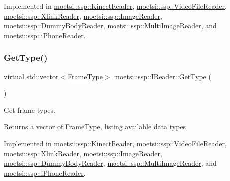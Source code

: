 Implemented in \hyperlink{classmoetsi_1_1ssp_1_1KinectReader_aef896aa686cbe1ea82dfc6aad46b6ff7}{moetsi\+::ssp\+::\+Kinect\+Reader}, \hyperlink{classmoetsi_1_1ssp_1_1VideoFileReader_a9d47af47299c5fccf766ac2d848a561b}{moetsi\+::ssp\+::\+Video\+File\+Reader}, \hyperlink{classmoetsi_1_1ssp_1_1XlinkReader_a2119c9bc9e4929ff37115a7be463eb92}{moetsi\+::ssp\+::\+Xlink\+Reader}, \hyperlink{classmoetsi_1_1ssp_1_1ImageReader_af6f66957b6e3268c5336f4176c77fc73}{moetsi\+::ssp\+::\+Image\+Reader}, \hyperlink{classmoetsi_1_1ssp_1_1DummyBodyReader_a2219d7fd14ca1448fb4c6f2541ac3c9b}{moetsi\+::ssp\+::\+Dummy\+Body\+Reader}, \hyperlink{classmoetsi_1_1ssp_1_1MultiImageReader_ad5f6cf0cfb1e64bcf569ab0bbfcce9d6}{moetsi\+::ssp\+::\+Multi\+Image\+Reader}, and \hyperlink{classmoetsi_1_1ssp_1_1iPhoneReader_a05d285ace85fc570bc2f453a0862ae56}{moetsi\+::ssp\+::i\+Phone\+Reader}.

\mbox{\label{classmoetsi_1_1ssp_1_1IReader_a4116c1931fde7bd66133934ffdca1cce}} 
\subsubsection{\texorpdfstring{Get\+Type()}{GetType()}\hspace{0.1cm}{\footnotesize\ttfamily [2/2]}}
{\footnotesize\ttfamily virtual std\+::vector$<$\hyperlink{namespacemoetsi_1_1ssp_a46efdfa2cd5a28ead465dcc8006b5a87}{Frame\+Type}$>$ moetsi\+::ssp\+::\+I\+Reader\+::\+Get\+Type (\begin{DoxyParamCaption}{ }\end{DoxyParamCaption})\hspace{0.3cm}{\ttfamily [pure virtual]}}



Get frame types. 

\begin{DoxyReturn}{Returns}
a vector of Frame\+Type, listing available data types 
\end{DoxyReturn}


Implemented in \hyperlink{classmoetsi_1_1ssp_1_1KinectReader_aef896aa686cbe1ea82dfc6aad46b6ff7}{moetsi\+::ssp\+::\+Kinect\+Reader}, \hyperlink{classmoetsi_1_1ssp_1_1VideoFileReader_a9d47af47299c5fccf766ac2d848a561b}{moetsi\+::ssp\+::\+Video\+File\+Reader}, \hyperlink{classmoetsi_1_1ssp_1_1XlinkReader_a2119c9bc9e4929ff37115a7be463eb92}{moetsi\+::ssp\+::\+Xlink\+Reader}, \hyperlink{classmoetsi_1_1ssp_1_1ImageReader_af6f66957b6e3268c5336f4176c77fc73}{moetsi\+::ssp\+::\+Image\+Reader}, \hyperlink{classmoetsi_1_1ssp_1_1DummyBodyReader_a2219d7fd14ca1448fb4c6f2541ac3c9b}{moetsi\+::ssp\+::\+Dummy\+Body\+Reader}, \hyperlink{classmoetsi_1_1ssp_1_1MultiImageReader_ad5f6cf0cfb1e64bcf569ab0bbfcce9d6}{moetsi\+::ssp\+::\+Multi\+Image\+Reader}, and \hyperlink{classmoetsi_1_1ssp_1_1iPhoneReader_a05d285ace85fc570bc2f453a0862ae56}{moetsi\+::ssp\+::i\+Phone\+Reader}.

